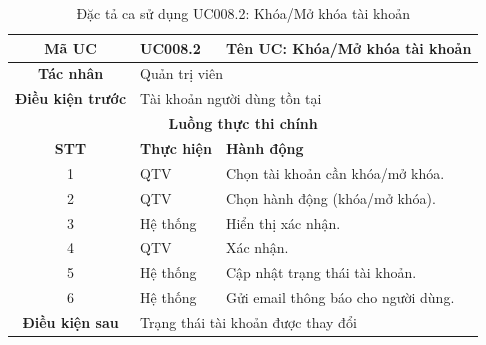 \begin{table}[H]
    \centering
    \label{tab:uc008-2}
    \begin{tabularx}{\textwidth}{|c|p{3.5cm}|X|}
        \hline
        \rowcolor{headergreen} 
        \textbf{Mã UC} & \textbf{UC008.2} & \textbf{Tên UC: Khóa/Mở khóa tài khoản} \\ \hline
        \textbf{Tác nhân} & \multicolumn{2}{l|}{Quản trị viên} \\ \hline
        \textbf{Điều kiện trước} & \multicolumn{2}{X|}{Tài khoản người dùng tồn tại} \\ \hline
        
        \multicolumn{3}{|c|}{\cellcolor{headerorange}\textbf{Luồng thực thi chính}} \\ \hline
        \rowcolor{graybg} \textbf{STT} & \textbf{Thực hiện} & \textbf{Hành động} \\ \hline
        1 & QTV & Chọn tài khoản cần khóa/mở khóa. \\ \hline
        2 & QTV & Chọn hành động (khóa/mở khóa). \\ \hline
        3 & Hệ thống & Hiển thị xác nhận. \\ \hline
        4 & QTV & Xác nhận. \\ \hline
        5 & Hệ thống & Cập nhật trạng thái tài khoản. \\ \hline
        6 & Hệ thống & Gửi email thông báo cho người dùng. \\ \hline
        
        \textbf{Điều kiện sau} & \multicolumn{2}{X|}{Trạng thái tài khoản được thay đổi} \\ \hline
    \end{tabularx}
    \caption{Đặc tả ca sử dụng UC008.2: Khóa/Mở khóa tài khoản}
\end{table}

